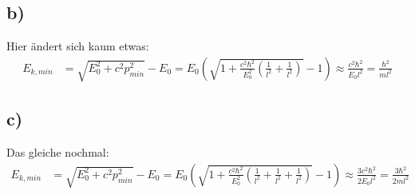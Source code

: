 \documentclass[a4paper,12pt]{article}
\newcommand{\kla}{}
\begin{document}
\subsection*{b)}
Hier ändert sich kaum etwas:
\begin{align*}
E_{k,min}&=\sqrt{E_0^2+c^2p_{min}^2}-E_0=E_0\kla\left( {\sqrt{1+\frac{c^2\hbar^2}{E_0^2}\kla\left( {\frac{1}{l^2}+\frac{1}{l^2}} \right)}-1} \right)\approx \frac{c^2\hbar^2}{E_0l^2}=\frac{\hbar^2}{ml^2}
\end{align*}
\subsection*{c)}
Das gleiche nochmal:
\begin{align*}
E_{k,min}&=\sqrt{E_0^2+c^2p_{min}^2}-E_0=E_0\kla\left( {\sqrt{1+\frac{c^2\hbar^2}{E_0^2}\kla\left( {\frac{1}{l^2}+\frac{1}{l^2}+\frac{1}{l^2}} \right)}-1} \right)\approx \frac{3c^2\hbar^2}{2E_0l^2}=\frac{3\hbar^2}{2ml^2}
\end{align*}
\end{document}
